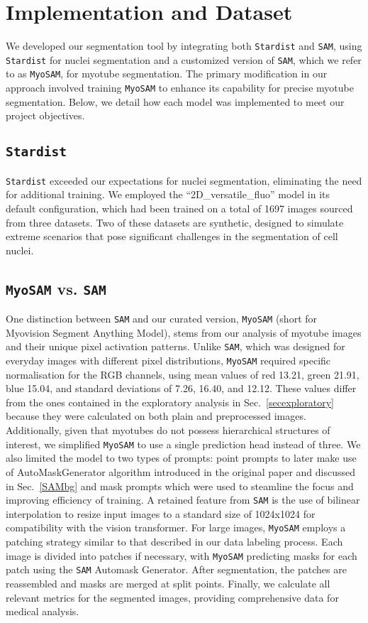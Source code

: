 \section{Implementation and Dataset}\label{secdataset}

We developed our segmentation tool by integrating both \texttt{Stardist} and \texttt{SAM}, using \texttt{Stardist} for nuclei segmentation and a customized version of \texttt{SAM}, which we refer to as \texttt{MyoSAM}, for myotube segmentation. The primary modification in our approach involved training \texttt{MyoSAM} to enhance its capability for precise myotube segmentation. Below, we detail how each model was implemented to meet our project objectives.

\subsection{\texttt{Stardist}}
\texttt{Stardist} exceeded our expectations for nuclei segmentation, eliminating the need for additional training. We employed the ``2D\_versatile\_fluo'' model in its default configuration, which had been trained on a total of 1697 images sourced from three datasets. Two of these datasets are synthetic, designed to simulate extreme scenarios that pose significant challenges in the segmentation of cell nuclei.

\subsection{\texttt{MyoSAM} vs. \texttt{SAM}}
One distinction between \texttt{SAM} and our curated version, \texttt{MyoSAM} (short for Myovision Segment Anything Model), stems from our analysis of myotube images and their unique pixel activation patterns. Unlike \texttt{SAM}, which was designed for everyday images with different pixel distributions, \texttt{MyoSAM} required specific normalisation for the RGB channels, using mean values of red 13.21, green 21.91, blue 15.04, and standard deviations of 7.26, 16.40, and 12.12. These values differ from the ones contained in the exploratory analysis in Sec.~\ref{secexploratory} because they were calculated on both plain and preprocessed images. Additionally, given that myotubes do not possess hierarchical structures of interest, we simplified \texttt{MyoSAM} to use a single prediction head instead of three. We also limited the model to two types of prompts: point prompts to later make use of AutoMaskGenerator algorithm introduced in the original paper and discussed in Sec.~\ref{SAMbg} and mask prompts which were used to steamline the focus and improving efficiency of training.
A retained feature from \texttt{SAM} is the use of bilinear interpolation to resize input images to a standard size of 1024x1024 for compatibility with the vision transformer. For large images, \texttt{MyoSAM} employs a patching strategy similar to that described in our data labeling process. Each image is divided into patches if necessary, with \texttt{MyoSAM} predicting masks for each patch using the \texttt{SAM} Automask Generator. After segmentation, the patches are reassembled and masks are merged at split points. Finally, we calculate all relevant metrics for the segmented images, providing comprehensive data for medical analysis.


